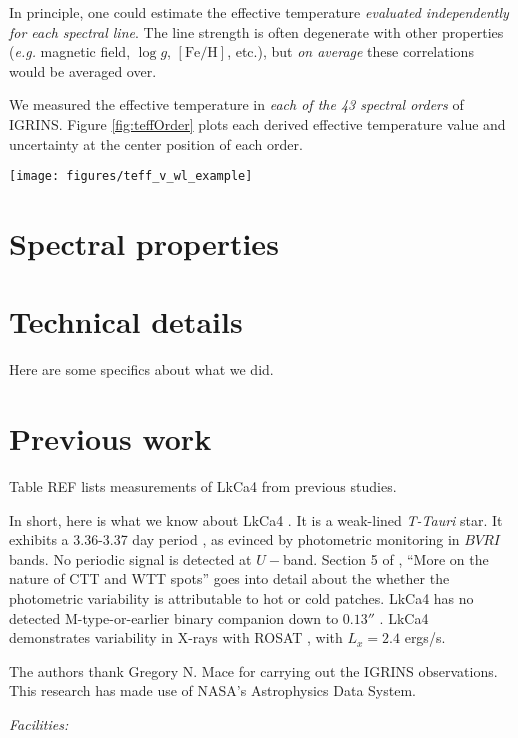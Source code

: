 \documentclass[onecolumn]{emulateapj}%
\newcommand{\name}{LkCa4 }
\begin{document}
In principle, one could estimate the effective temperature \emph{evaluated independently for each spectral line}.  The line strength is often degenerate with other properties (\emph{e.g.} magnetic field, $\log{g}$, $[\mathrm{Fe}/\mathrm{H}]$, etc.), but \emph{on average} these correlations would be averaged over.

We measured the effective temperature in \emph{each of the 43 spectral orders} of IGRINS.  Figure \ref{fig:teffOrder} plots each derived effective temperature value and uncertainty at the center position of each order.

\begin{figure*}
	\centering
	\texttt{[image: figures/teff\_v\_wl\_example]} 
	\caption{Effective temperature as derived by different orders.}
	\label{fig:teffOrder}
\end{figure*}


\section{Spectral properties}\label{sec:lines}


\appendix

\section{Technical details}

Here are some specifics about what we did.

\section{Previous work}

Table REF lists measurements of LkCa4 from previous studies.


In short, here is what we know about \name.  It is a weak-lined \emph{T-Tauri} star.  It exhibits a 3.36-3.37 day period \citep{1993AJ....106.1608V,1994IBVS.4042....1G}, as evinced by photometric monitoring in $BVRI$ bands.  No periodic signal is detected at $U-$band.  Section 5 of \citet{1993AJ....106.1608V}, ``More on the nature of CTT and WTT spots'' goes into detail about the whether the photometric variability is attributable to hot or cold patches.  \name has no detected M-type-or-earlier binary companion down to $0.13''$ \citep{1993A&A...278..129L}.  \name demonstrates variability in X-rays with ROSAT \citep{1994ApJ...424..237S}, with $L_{x}=2.4$ ergs/s.


\acknowledgements
The authors thank Gregory N. Mace for carrying out the IGRINS observations. This research has made use of NASA's Astrophysics Data System.

{\it Facilities:} 

\clearpage



\end{document}
